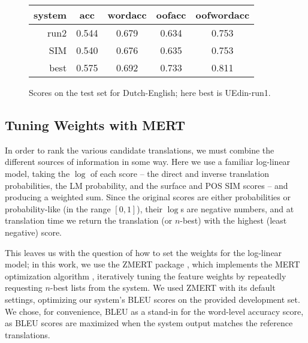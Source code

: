 \documentclass[11pt]{article}
\begin{document}
\begin{figure}[t]
  \begin{center}
  \begin{tabular}{|r|c|c|c|c|}
    \hline
    system & acc      & wordacc  & oofacc & oofwordacc \\
    \hline
    run2        &  0.544      &  0.679  & 0.634   & 0.753    \\
    SIM              &  0.540      &  0.676  & 0.635   & 0.753    \\
    best       &  0.575   & 0.692  & 0.733      &  0.811 \\
    \hline
  \end{tabular}
  \end{center}
\caption{Scores on the test set for Dutch-English; here best is UEdin-run1.}
\label{fig:theresults-nl-en}
\end{figure}



\subsection{Tuning Weights with MERT}
\label{sec:mert}

In order to rank the various candidate translations, we must combine the
different sources of information in some way.  Here we use a familiar
log-linear model, taking the $\log$ of each score -- the direct and inverse
translation probabilities, the LM probability, and the surface and POS SIM
scores -- and producing a weighted sum. Since the original scores are either
probabilities or probability-like (in the range $[0,1]$), their $\log$s are
negative numbers, and at translation time we return the translation (or
$n$-best) with the highest (least negative) score.

This leaves us with the question of how to set the weights for the log-linear
model; in this work, we use the ZMERT package \cite{zaidan:zmert:09}, which
implements the MERT optimization algorithm \cite{och:2003:ACL}, iteratively
tuning the feature weights by repeatedly requesting $n$-best lists from the
system. We used ZMERT with its default settings, optimizing our system's
BLEU scores on the provided development set. We chose, for convenience, BLEU as
a stand-in for the word-level accuracy score, as BLEU scores are maximized when
the system output matches the reference translations.
\end{document}
